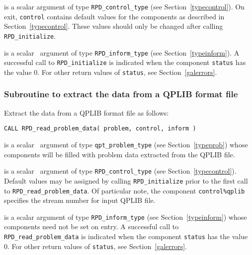 \documentclass{galahad}
\newcommand{\packagename}{RPD}
\begin{document}
\begin{description}

 is a scalar \intentout argument of type
{\tt \packagename\_control\_type}
(see Section~\ref{typecontrol}).
On exit, {\tt control} contains default values for the components as
described in Section~\ref{typecontrol}.
These values should only be changed after calling
{\tt \packagename\_initialize}.

 is a scalar \intentout\ argument of type
{\tt \packagename\_inform\_type}
(see Section~\ref{typeinform}). A successful call to
{\tt \packagename\_initialize}
is indicated when the  component {\tt status} has the value 0.
For other return values of {\tt status}, see Section~\ref{galerrors}.

\end{description}


\subsubsection{Subroutine to extract the data from a QPLIB format file}
Extract the data from a QPLIB format file as follows:

\hskip0.5in
{\tt CALL \packagename\_read\_problem\_data( problem, control, inform )}

\begin{description}

 is a scalar \intentinout\ argument of type
{\tt qpt\_problem\_type} (see Section~\ref{typeprob}) whose
components will be filled with problem data extracted from the
QPLIB file.

 is a scalar \intentin\ argument of type
{\tt \packagename\_control\_type}
(see Section~\ref{typecontrol}).
Default values may be assigned by calling {\tt \packagename\_initialize}
prior to the first call to {\tt \packagename\_read\_problem\_data}.
Of particular note, the component {\tt control\%qplib} specifies
the stream number for input QPLIB file.

 is a scalar \intentinout argument of type
{\tt \packagename\_inform\_type}
(see Section~\ref{typeinform}) whose components need not be set on entry.
A successful call to
{\tt \packagename\_read\_problem\_data}
is indicated when the  component {\tt status} has the value 0.
For other return values of {\tt status}, see Section~\ref{galerrors}.

\end{description}
\end{document}
